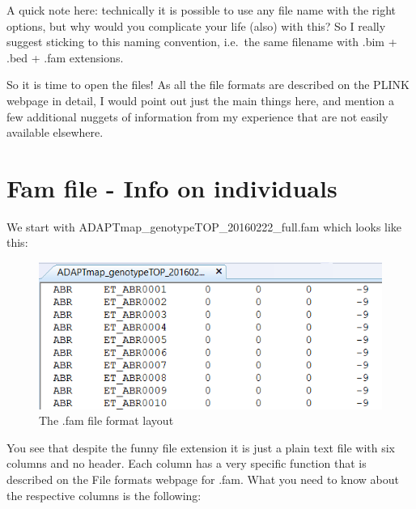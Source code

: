 \documentclass[]{book}
\begin{document}
A quick note here: technically it is possible to use any file name with
the right options, but why would you complicate your life (also) with
this? So I really suggest sticking to this naming convention, i.e.~the
same filename with .bim + .bed + .fam extensions.

So it is time to open the files! As all the file formats are described
on the PLINK webpage in detail, I would point out just the main things
here, and mention a few additional nuggets of information from my
experience that are not easily available elsewhere.

\section{Fam file - Info on
individuals}\label{fam-file---info-on-individuals}

We start with ADAPTmap\_genotypeTOP\_20160222\_full.fam which looks like
this:

\begin{figure}
\includegraphics[width=7.56in]{images/6-2-AdaptMapFamFile} \caption{The .fam file format layout}\label{fig:fig6-2}
\end{figure}

You see that despite the funny file extension it is just a plain text
file with six columns and no header. Each column has a very specific
function that is described on the File formats webpage for .fam. What
you need to know about the respective columns is the following:
\end{document}
